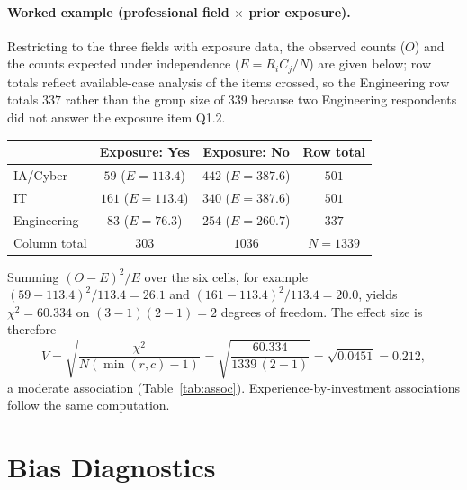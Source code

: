 \paragraph{Worked example (professional field $\times$ prior exposure).} Restricting to the three fields with exposure data, the observed counts ($O$) and the counts expected under independence ($E=R_iC_j/N$) are given below; row totals reflect available-case analysis of the items crossed, so the Engineering row totals $337$ rather than the group size of $339$ because two Engineering respondents did not answer the exposure item Q1.2.
\begin{center}\small
\begin{tabular}{lccc}
\toprule
 & Exposure: Yes & Exposure: No & Row total \\
\midrule
IA/Cyber & $59$ \;($E=113.4$) & $442$ \;($E=387.6$) & $501$ \\
IT       & $161$ \;($E=113.4$) & $340$ \;($E=387.6$) & $501$ \\
Engineering & $83$ \;($E=76.3$) & $254$ \;($E=260.7$) & $337$ \\
\midrule
Column total & $303$ & $1036$ & $N=1339$ \\
\bottomrule
\end{tabular}
\end{center}
Summing $(O-E)^2/E$ over the six cells, for example $(59-113.4)^2/113.4 = 26.1$ and $(161-113.4)^2/113.4 = 20.0$, yields $\chi^2 = 60.334$ on $(3-1)(2-1)=2$ degrees of freedom. The effect size is therefore
\begin{equation}
  V = \sqrt{\frac{\chi^2}{N\left(\min(r,c)-1\right)}}
    = \sqrt{\frac{60.334}{1339\,(2-1)}} = \sqrt{0.0451} = 0.212,
\end{equation}
a moderate association (Table~\ref{tab:assoc}). Experience-by-investment associations follow the same computation.

\section{Bias Diagnostics}

